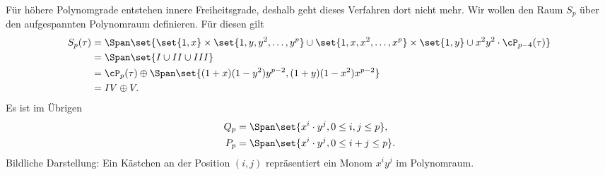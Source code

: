 Für höhere Polynomgrade entstehen innere Freiheitsgrade, deshalb geht dieses Verfahren dort nicht mehr. Wir wollen den Raum $S_{p}$ über den aufgespannten Polynomraum definieren. Für diesen gilt
\begin{align*}
  S_{p}(\tau) &= \Span\set{ \set{1, x} \times \set{1, y, y^{2}, \dots, y^{p}} \cup \set{1, x, x^{2}, \dots, x^{p}} \times \set{1, y} \cup x^{2}y^{2} \cdot\cP_{p-4}(\tau)}\\
&= \Span\set{I \cup II \cup III}\\
&= \cP_{p}(\tau) \oplus \Span \set{(1+x)(1-y^{2})y^{p-2}, (1+y)(1-x^{2})x^{p-2}} \\
&= IV \oplus V.
\end{align*}
Es ist im Übrigen
\begin{align*}
  Q_{p} &= \Span \set{x^{i}\cdot y^{j}, 0 \leq i, j \leq p},\\
  P_{p} &= \Span \set{x^{i}\cdot y^{j}, 0 \leq i + j \leq p}. 
\end{align*}
Bildliche Darstellung: Ein Kästchen an der Position $(i, j)$ repräsentiert ein Monom $x^{i}y^{j}$ im Polynomraum. 

